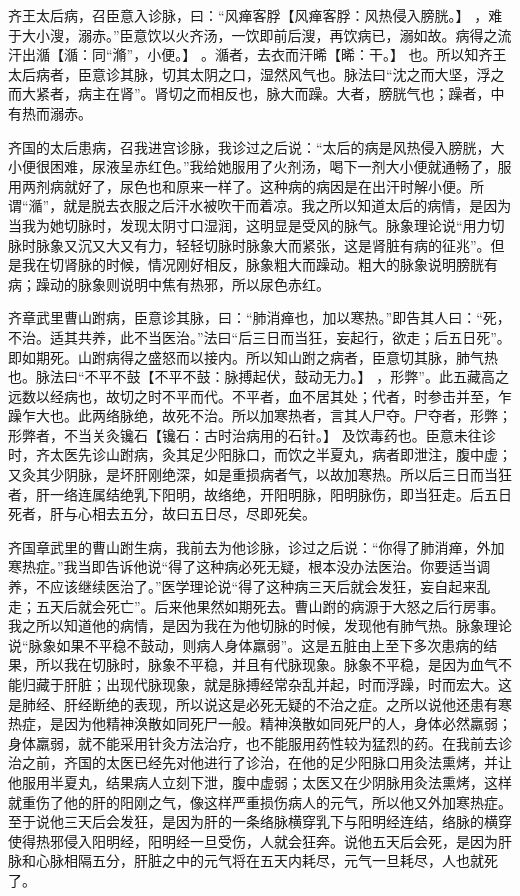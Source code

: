 \documentclass[12pt,UTF8]{ctexbook}
\begin{document}
齐王太后病，召臣意入诊脉，曰：“风瘅客脬【风瘅客脬：风热侵入膀胱。】 ，难于大小溲，溺赤。”臣意饮以火齐汤，一饮即前后溲，再饮病已，溺如故。病得之流汗出㵌【㵌：同“滫”，小便。】 。㵌者，去衣而汗晞【晞：干。】 也。所以知齐王太后病者，臣意诊其脉，切其太阴之口，湿然风气也。脉法曰“沈之而大坚，浮之而大紧者，病主在肾”。肾切之而相反也，脉大而躁。大者，膀胱气也；躁者，中有热而溺赤。

齐国的太后患病，召我进宫诊脉，我诊过之后说：“太后的病是风热侵入膀胱，大小便很困难，尿液呈赤红色。”我给她服用了火剂汤，喝下一剂大小便就通畅了，服用两剂病就好了，尿色也和原来一样了。这种病的病因是在出汗时解小便。所谓“㵌”，就是脱去衣服之后汗水被吹干而着凉。我之所以知道太后的病情，是因为当我为她切脉时，发现太阴寸口湿润，这明显是受风的脉气。脉象理论说“用力切脉时脉象又沉又大又有力，轻轻切脉时脉象大而紧张，这是肾脏有病的征兆”。但是我在切肾脉的时候，情况刚好相反，脉象粗大而躁动。粗大的脉象说明膀胱有病；躁动的脉象则说明中焦有热邪，所以尿色赤红。

齐章武里曹山跗病，臣意诊其脉，曰：“肺消瘅也，加以寒热。”即告其人曰：“死，不治。适其共养，此不当医治。”法曰“后三日而当狂，妄起行，欲走；后五日死”。即如期死。山跗病得之盛怒而以接内。所以知山跗之病者，臣意切其脉，肺气热也。脉法曰“不平不鼓【不平不鼓：脉搏起伏，鼓动无力。】 ，形弊”。此五藏高之远数以经病也，故切之时不平而代。不平者，血不居其处；代者，时参击并至，乍躁乍大也。此两络脉绝，故死不治。所以加寒热者，言其人尸夺。尸夺者，形弊；形弊者，不当关灸镵石【镵石：古时治病用的石针。】 及饮毒药也。臣意未往诊时，齐太医先诊山跗病，灸其足少阳脉口，而饮之半夏丸，病者即泄注，腹中虚；又灸其少阴脉，是坏肝刚绝深，如是重损病者气，以故加寒热。所以后三日而当狂者，肝一络连属结绝乳下阳明，故络绝，开阳明脉，阳明脉伤，即当狂走。后五日死者，肝与心相去五分，故曰五日尽，尽即死矣。

齐国章武里的曹山跗生病，我前去为他诊脉，诊过之后说：“你得了肺消瘅，外加寒热症。”我当即告诉他说“得了这种病必死无疑，根本没办法医治。你要适当调养，不应该继续医治了。”医学理论说“得了这种病三天后就会发狂，妄自起来乱走；五天后就会死亡”。后来他果然如期死去。曹山跗的病源于大怒之后行房事。我之所以知道他的病情，是因为我在为他切脉的时候，发现他有肺气热。脉象理论说“脉象如果不平稳不鼓动，则病人身体羸弱”。这是五脏由上至下多次患病的结果，所以我在切脉时，脉象不平稳，并且有代脉现象。脉象不平稳，是因为血气不能归藏于肝脏；出现代脉现象，就是脉搏经常杂乱并起，时而浮躁，时而宏大。这是肺经、肝经断绝的表现，所以说这是必死无疑的不治之症。之所以说他还患有寒热症，是因为他精神涣散如同死尸一般。精神涣散如同死尸的人，身体必然羸弱；身体羸弱，就不能采用针灸方法治疗，也不能服用药性较为猛烈的药。在我前去诊治之前，齐国的太医已经先对他进行了诊治，在他的足少阳脉口用灸法熏烤，并让他服用半夏丸，结果病人立刻下泄，腹中虚弱；太医又在少阴脉用灸法熏烤，这样就重伤了他的肝的阳刚之气，像这样严重损伤病人的元气，所以他又外加寒热症。至于说他三天后会发狂，是因为肝的一条络脉横穿乳下与阳明经连结，络脉的横穿使得热邪侵入阳明经，阳明经一旦受伤，人就会狂奔。说他五天后会死，是因为肝脉和心脉相隔五分，肝脏之中的元气将在五天内耗尽，元气一旦耗尽，人也就死了。
\end{document}
